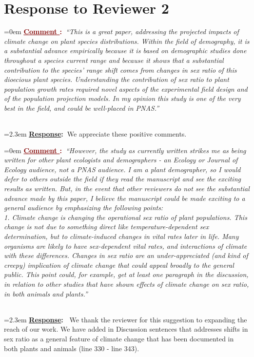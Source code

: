 \documentclass[12pt]{article}
\newcounter{cN}
\newcommand{\comment}[1]{
	\vspace{2em}
	\refstepcounter{cN} %
	\noindent \hangindent=0em \textbf{\textcolor{Maroon}{\uline{Comment \thecN}:~}}\emph{``#1''}
	}
\newcommand{\response}[1]{
	\\[0.25em]
	\hangindent=2.3em \textbf{\textcolor{NavyBlue}{\uline{Response}:~}}#1
	}
\begin{document}
\section{Response to Reviewer 2}
\vspace{-2em}

\comment{This is a great paper, addressing the projected impacts of climate change on plant species distributions. Within the field of demography, it is a substantial advance empirically because it is based on demographic studies done throughout a species current range and because it shows that a substantial contribution to the species' range shift comes from changes in sex ratio of this dioecious plant species. Understanding the contribution of sex ratio to plant population growth rates required novel aspects of the experimental field design and of the population projection models. In my opinion this study is one of the very best in the field, and could be well-placed in PNAS.}
\response{We  appreciate these positive comments.}

\comment{However, the study as currently written strikes me as being written for other plant ecologists and demographers - an Ecology or Journal of Ecology audience, not a PNAS audience. I am a plant demographer, so I would defer to others outside the field if they read the manuscript and see the exciting results as written. But, in the event that other reviewers do not see the substantial advance made by this paper, I believe the manuscript could be made exciting to a general audience by emphasizing the following points:
\\
1. Climate change is changing the operational sex ratio of plant populations. This change is not due to something direct like temperature-dependent sex determination, but to climate-induced changes in vital rates later in life. Many organisms are likely to have sex-dependent vital rates, and interactions of climate with these differences. Changes in sex ratio are an under-appreciated (and kind of creepy) implication of climate change that could appeal broadly to the general public. This point could, for example, get at least one paragraph in the discussion, in relation to other studies that have shown effects of climate change on sex ratio, in both animals and plants.}
\response{ We thank the reviewer for this suggestion to expanding the reach of our work. We have added in Discussion sentences that addresses shifts in sex ratio as a general feature of climate change that has been documented in both plants and animals (line 330 - line 343).
}
\end{document}
